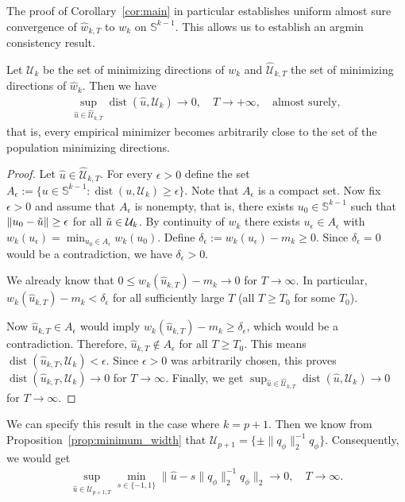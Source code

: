 The proof of Corollary~\ref{cor:main} in particular establishes uniform almost sure convergence of $\hat{w}_{k,T}$ to $w_k$ on $\mathbb{S}^{k-1}$. This allows us to establish an argmin consistency result.

\begin{Cor}
    Let $\mathcal{U}_k$ be the set of minimizing directions of $w_k$ and $\hat{\mathcal{U}}_{k,T}$ the set of minimizing directions of $\hat{w}_k$. Then we have
    \begin{align*}
        \sup_{\hat{u}\in\hat{\mathcal{U}}_{k,T}}\operatorname{dist}(\hat{u},\mathcal{U}_k)\to0,\quad T\to+\infty,\quad\text{almost surely},
    \end{align*}
    that is, every empirical minimizer becomes arbitrarily close to the set of the population minimizing directions.
\end{Cor}

\begin{proof}
    Let $\hat{u}\in\hat{\mathcal{U}}_{k,T}$. For every $\epsilon>0$ define the set $A_{\epsilon}:=\{u\in\mathbb{S}^{k-1}:\operatorname{dist}(u,\mathcal{U}_k)\ge\epsilon\}$. Note that $A_{\epsilon}$ is a compact set. Now fix $\epsilon>0$ and assume that $A_{\epsilon}$ is nonempty, that is, there exists $u_0\in\mathbb{S}^{k-1}$ such that $\|u_0-\Tilde{u}\|\ge\epsilon$ for all $\Tilde{u}\in\mathcal{U}_k$. By continuity of $w_k$ there exists $u_{\epsilon}\in A_{\epsilon}$ with $w_k(u_{\epsilon})=\min_{u_0\in A_{\epsilon}}w_k(u_0)$. Define $\delta_{\epsilon}:=w_k(u_{\epsilon})-m_k\ge0$. Since $\delta_{\epsilon}=0$ would be a contradiction, we have $\delta_{\epsilon}>0$.

    We already know that $0\le w_k(\hat{u}_{k,T})-m_k\to0$ for $T\to\infty$. In particular, $w_k(\hat{u}_{k,T})-m_k<\delta_{\epsilon}$ for all sufficiently large $T$ (all $T\ge T_0$ for some $T_0$).

    Now $\hat{u}_{k,T}\in A_{\epsilon}$ would imply $w_k(\hat{u}_{k,T})-m_k\ge\delta_{\epsilon}$, which would be a contradiction. Therefore, $\hat{u}_{k,T}\notin A_{\epsilon}$ for all $T\ge T_0$. This means $\operatorname{dist}(\hat{u}_{k,T},\mathcal{U}_k)<\epsilon$. Since $\epsilon>0$ was arbitrarily chosen, this proves $\operatorname{dist}(\hat{u}_{k,T},\mathcal{U}_k)\to0$ for $T\to\infty$. Finally, we get $\sup_{\hat{u}\in\hat{\mathcal{U}}_{k,T}}\operatorname{dist}(\hat{u},\mathcal{U}_k)\to0$ for $T\to\infty$.
\end{proof}

We can specify this result in the case where $k=p+1$. Then we know from Proposition~\ref{prop:minimum_width} that $\mathcal{U}_{p+1}=\{\pm\|q_{\phi}\|_2^{-1}q_{\phi}\}$. Consequently, we would get
\begin{align*}
    \sup_{\hat{u}\in\hat{\mathcal{U}}_{p+1,T}}\min_{s\in\{-1,1\}}\|\hat{u}-s\|q_{\phi}\|_2^{-1}q_{\phi}\|_2\to0,\quad T\to\infty.
\end{align*}

